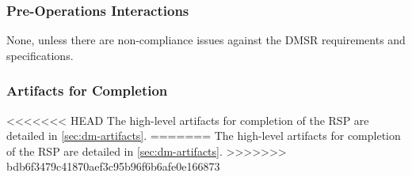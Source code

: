 \subsubsection{Pre-Operations Interactions}
None, unless there are non-compliance issues against the DMSR requirements and specifications.

\subsubsection{Artifacts for Completion}
<<<<<<< HEAD
The high-level artifacts for completion of the RSP are detailed in \ref{sec:dm-artifacts}.   
=======
The high-level artifacts for completion of the RSP are detailed in \ref{sec:dm-artifacts}.   
>>>>>>> bdb6f3479c41870aef3c95b96f6b6afe0e166873
